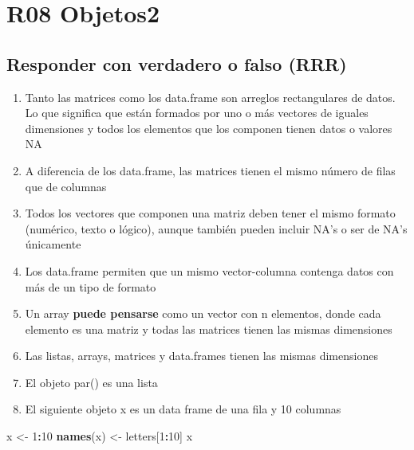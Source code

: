 \documentclass[]{book}
\newenvironment{Shaded}{\begin{snugshade}}{\end{snugshade}}
\newcommand{\DecValTok}[1]{\textcolor[rgb]{0.00,0.00,0.81}{#1}}
\newcommand{\KeywordTok}[1]{\textcolor[rgb]{0.13,0.29,0.53}{\textbf{#1}}}
\newcommand{\NormalTok}[1]{#1}
\newcommand{\OperatorTok}[1]{\textcolor[rgb]{0.81,0.36,0.00}{\textbf{#1}}}
\newcommand{\StringTok}[1]{\textcolor[rgb]{0.31,0.60,0.02}{#1}}
\providecommand{\tightlist}{%
  \setlength{\itemsep}{0pt}\setlength{\parskip}{0pt}}
\begin{document}
\hypertarget{r08-objetos2}{%
\chapter*{R08 Objetos2}\label{r08-objetos2}}

\hypertarget{responder-con-verdadero-o-falso-rrr-2}{%
\section{Responder con verdadero o falso (RRR)}\label{responder-con-verdadero-o-falso-rrr-2}}

\begin{enumerate}
\def\labelenumi{\arabic{enumi}.}
\tightlist
\item
  Tanto las matrices como los data.frame son arreglos rectangulares de datos. Lo que significa que están formados por uno o más vectores de iguales dimensiones y todos los elementos que los componen tienen datos o valores NA
\item
  A diferencia de los data.frame, las matrices tienen el mismo número de filas que de columnas
\item
  Todos los vectores que componen una matriz deben tener el mismo formato (numérico, texto o lógico), aunque también pueden incluir NA's o ser de NA's únicamente
\item
  Los data.frame permiten que un mismo vector-columna contenga datos con más de un tipo de formato
\item
  Un array \textbf{puede pensarse} como un vector con n elementos, donde cada elemento es una matriz y todas las matrices tienen las mismas dimensiones
\item
  Las listas, arrays, matrices y data.frames tienen las mismas dimensiones
\item
  El objeto par() es una lista
\item
  El siguiente objeto x es un data frame de una fila y 10 columnas
\end{enumerate}

\begin{Shaded}
\begin{Highlighting}[]
\NormalTok{x <-}\StringTok{ }\DecValTok{1}\OperatorTok{:}\DecValTok{10}
    \KeywordTok{names}\NormalTok{(x) <-}\StringTok{ }\NormalTok{letters[}\DecValTok{1}\OperatorTok{:}\DecValTok{10}\NormalTok{]}
\NormalTok{        x}
\end{Highlighting}
\end{Shaded}
\end{document}
